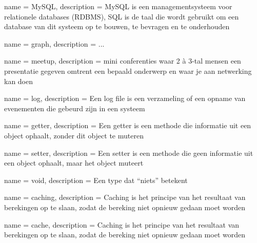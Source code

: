 


{
  name = MySQL,
  description = {MySQL is een managementsysteem voor relationele databases (\gls{RDBMS}), SQL is de taal die wordt gebruikt om een database van dit systeem op te bouwen, te bevragen en te onderhouden}
}

{
  name = graph,
  description = {...}
}

{
  name = meetup,
  description = {mini conferenties waar 2 à 3-tal mensen een presentatie gegeven omtrent een bepaald onderwerp en waar je aan netwerking kan doen}
}

{
  name = log,
  description = {Een log file is een verzameling of een opname van evenementen die gebeurd zijn in een systeem}
}

{
  name = getter,
  description = {Een getter is een methode die informatie uit een object ophaalt, zonder dit object te muteren}
}

{
  name = setter,
  description = {Een setter is een methode die geen informatie uit een object ophaalt, maar het object muteert}
}

{
  name = void,
  description = {Een type dat ``niets'' betekent}
}

{
  name = caching,
  description = {Caching is het principe van het resultaat van berekingen op te slaan, zodat de bereking niet opnieuw gedaan moet worden}
}

{
  name = cache,
  description = {Caching is het principe van het resultaat van berekingen op te slaan, zodat de bereking niet opnieuw gedaan moet worden}
}

